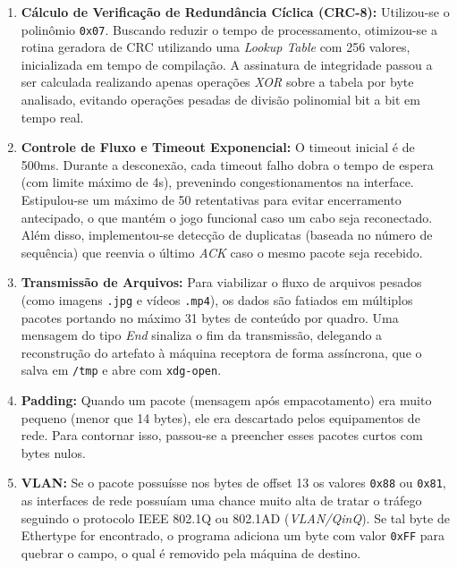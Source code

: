 \documentclass[12pt,a4paper]{article}
\begin{document}
\begin{enumerate}
    \item \textbf{Cálculo de Verificação de Redundância Cíclica (CRC-8):} 
    Utilizou-se o polinômio \texttt{0x07}. Buscando reduzir o tempo de processamento, otimizou-se a rotina geradora de CRC utilizando uma \textit{Lookup Table} com 256 valores, inicializada em tempo de compilação. A assinatura de integridade passou a ser calculada realizando apenas operações \textit{XOR} sobre a tabela por byte analisado, evitando operações pesadas de divisão polinomial bit a bit em tempo real.
    
    \item \textbf{Controle de Fluxo e Timeout Exponencial:} 
    O timeout inicial é de 500ms. Durante a desconexão, cada timeout falho dobra o tempo de espera (com limite máximo de 4s), prevenindo congestionamentos na interface. Estipulou-se um máximo de 50 retentativas para evitar encerramento antecipado, o que mantém o jogo funcional caso um cabo seja reconectado. Além disso, implementou-se detecção de duplicatas (baseada no número de sequência) que reenvia o último \textit{ACK} caso o mesmo pacote seja recebido.
    
    \item \textbf{Transmissão de Arquivos:} 
    Para viabilizar o fluxo de arquivos pesados (como imagens \texttt{.jpg} e vídeos \texttt{.mp4}), os dados são fatiados em múltiplos pacotes portando no máximo 31 bytes de conteúdo por quadro. Uma mensagem do tipo \textit{End} sinaliza o fim da transmissão, delegando a reconstrução do artefato à máquina receptora de forma assíncrona, que o salva em \texttt{/tmp} e abre com \texttt{xdg-open}.

    \item \textbf{Padding:}
    Quando um pacote (mensagem após empacotamento) era muito pequeno (menor que 14 bytes), ele era descartado pelos equipamentos de rede. Para contornar isso, passou-se a preencher esses pacotes curtos com bytes nulos.

    \item \textbf{VLAN:}
    Se o pacote possuísse nos bytes de offset 13 os valores \texttt{0x88} ou \texttt{0x81}, as interfaces de rede possuíam uma chance muito alta de tratar o tráfego seguindo o protocolo IEEE 802.1Q ou 802.1AD (\textit{VLAN/QinQ}). Se tal byte de Ethertype for encontrado, o programa adiciona um byte com valor \texttt{0xFF} para quebrar o campo, o qual é removido pela máquina de destino.
\end{enumerate}
\end{document}
